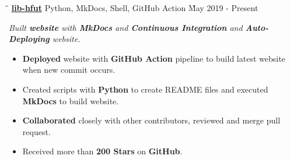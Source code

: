 \documentclass{res}
\begin{document}
\begin{resume}
    \vspace{0.00in}
    \begin{tabbing}
    \hspace{2.391in}\= \hspace{3in}\= \kill %
    \href{https://github.com/lib-hfut/lib-hfut}{\bf lib-hfut}  \> 
                Python, MkDocs, Shell, GitHub Action \` May 2019 - Present \\
    \end{tabbing}\vspace{-20pt}      %
    \vspace{-0.1in}
    \textit{Built {\bf website} with {\bf MkDocs} and {\bf Continuous Integration} and {\bf Auto-Deploying} website.}
    \vspace{+0.05in}
    \begin{itemize} \itemsep 1.5pt %
        \item {\bf Deployed} website with {\bf GitHub Action} pipeline to build latest website 
                when new commit occurs.
        \item Created scripts with {\bf Python} to create README files and executed {\bf MkDocs} to build website.
        \item {\bf Collaborated} closely with other contributors, reviewed and merge pull request.
        \item Received more than {\bf 200 Stars} on {\bf GitHub}.
    \end{itemize}

\end{resume}
\end{document}
